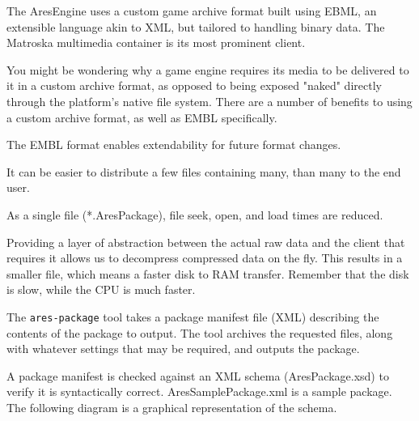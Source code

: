 


The AresEngine uses a custom game archive format built using EBML, an extensible language akin to XML, but tailored to handling binary data. The Matroska multimedia container is its most prominent client.

You might be wondering why a game engine requires its media to be delivered to it in a custom archive format, as opposed to being exposed "naked" directly through the platform's native file system. There are a number of benefits to using a custom archive format, as well as EMBL specifically.

\startitemize[3]
\item
The EMBL format enables extendability for future format changes.

\item
It can be easier to distribute a few files containing many, than many to the end user.

\item
As a single file (*.AresPackage), file seek, open, and load times are reduced.

\item
Providing a layer of abstraction between the actual raw data and the client that requires it allows us to decompress compressed data on the fly. This results in a smaller file, which means a faster disk to RAM transfer. Remember that the disk is slow, while the CPU is much faster.
\stopitemize

The {\tt ares-package} tool takes a package manifest file (XML) describing the contents of the package to output. The tool archives the requested files, along with whatever settings that may be required, and outputs the package.

A package manifest is checked against an XML schema (AresPackage.xsd) to verify it is syntactically correct. AresSamplePackage.xml is a sample package. The following diagram is a graphical representation of the schema.
    {}
    {}
    {}

